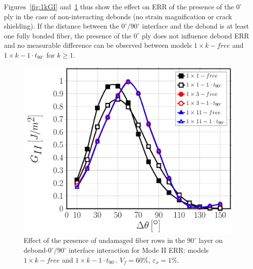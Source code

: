 \documentclass[review]{elsarticle}
\begin{document}
Figures~\ref{fig:1kGI} and~\ref{fig:1kGII} thus show the effect on ERR of the presence of the $0^{\circ}$ ply in the case of non-interacting debonds (no strain magnification or crack shielding). If the distance between the $0^{\circ}/90^{\circ}$ interface and the debond is at least one fully bonded fiber, the presence of the $0^{\circ}$ ply does not influence debond ERR and no measurable difference can be observed between models $1\times k-free$ and $1\times k-1\cdot t_{90^{\circ}}$ for $k\geq1$.

\begin{figure}[!h]
\centering
\includegraphics[width=\textwidth]{1xk-1-vf60-GII.pdf}
\caption{Effect of the presence of undamaged fiber rows in the $90^{\circ}$ layer on debond-$0^{\circ}/90^{\circ}$ interface interaction for Mode II ERR: models $1\times k-free$ and $1\times k-1\cdot t_{90^{\circ}}$. $V_{f}=60\%$, $\varepsilon_{x}=1\%$.}\label{fig:1kGII}
\end{figure}
\end{document}
